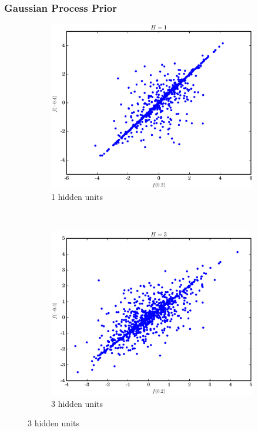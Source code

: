 \documentclass{beamer}
\begin{document}
\begin{frame}
  \frametitle{Gaussian Process Prior}
  \begin{figure}[!h]
    \centering
    \begin{subfigure}[b]{0.5\textwidth}
      \centering
      \includegraphics[width=\linewidth]{./figs/1.eps}
      \caption{1 hidden units}
    \end{subfigure}%
    ~ 
    \begin{subfigure}[b]{0.5\textwidth}
      \centering
      \includegraphics[width=\linewidth]{./figs/3.eps}
      \caption{3 hidden units}
    \end{subfigure}
  \end{figure}
\end{frame}
\end{document}
